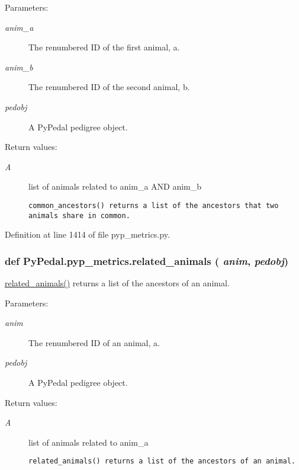 \begin{Desc}
\item[Parameters:]
\begin{description}
\item[{\em anim\_\-a}]The renumbered ID of the first animal, a. \item[{\em anim\_\-b}]The renumbered ID of the second animal, b. \item[{\em pedobj}]A Py\-Pedal pedigree object. \end{description}
\end{Desc}
\begin{Desc}
\item[Return values:]
\begin{description}
\item[{\em A}]list of animals related to anim\_\-a AND anim\_\-b

\footnotesize\begin{verbatim}common_ancestors() returns a list of the ancestors that two animals share in common.
\end{verbatim}
\normalsize
 \end{description}
\end{Desc}


Definition at line 1414 of file pyp\_\-metrics.py.\hypertarget{namespacePyPedal_1_1pyp__metrics_ec3083eaf96d141f21de2ee947cdeee8}{
\subsubsection[related\_\-animals]{\setlength{\rightskip}{0pt plus 5cm}def Py\-Pedal.pyp\_\-metrics.related\_\-animals ( {\em anim},  {\em pedobj})}}
\label{namespacePyPedal_1_1pyp__metrics_ec3083eaf96d141f21de2ee947cdeee8}


\hyperlink{namespacePyPedal_1_1pyp__metrics_ec3083eaf96d141f21de2ee947cdeee8}{related\_\-animals()} returns a list of the ancestors of an animal. 

\begin{Desc}
\item[Parameters:]
\begin{description}
\item[{\em anim}]The renumbered ID of an animal, a. \item[{\em pedobj}]A Py\-Pedal pedigree object. \end{description}
\end{Desc}
\begin{Desc}
\item[Return values:]
\begin{description}
\item[{\em A}]list of animals related to anim\_\-a

\footnotesize\begin{verbatim}related_animals() returns a list of the ancestors of an animal.
\end{verbatim}
\normalsize
 \end{description}
\end{Desc}


